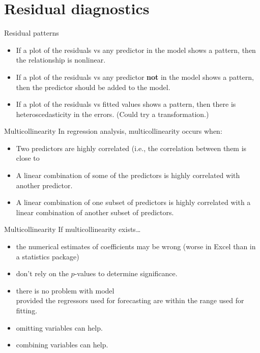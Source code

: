 \documentclass[14pt]{beamer}
\makeatletter
\def\biz{\begin{itemize}[<+-| alert@+>]}
\def\eiz{\end{itemize}}
\makeatother
\begin{document}
\section{Residual diagnostics}



\begin{frame}{Residual patterns}

\biz
\item If a plot of the residuals vs any predictor in the model shows a pattern, then the relationship is nonlinear.

\item If a plot of the residuals vs any predictor \textbf{not} in the model shows a pattern, then the predictor should be added to the model.

\item If a plot of the residuals vs fitted values shows a pattern, then there is heteroscedasticity in the errors. (Could try a transformation.)

\eiz
\end{frame}






\begin{frame}{Multicollinearity}
In regression analysis, multicollinearity occurs when:
\biz
\item  Two  predictors are highly  correlated (i.e., the correlation between them is close to 
\item A linear combination of some of the predictors is highly correlated  with another predictor.
\item  A linear combination of one subset of predictors is highly correlated with a linear combination of another
  subset of predictors. 
\eiz
\end{frame}

\begin{frame}{Multicollinearity}
If multicollinearity exists\dots
\biz%
\item the numerical estimates of coefficients may be wrong (worse in Excel than in a statistics package)
\item don't rely on the $p$-values to determine significance.
\item there is no problem with model \\ 
      provided the regressors used for forecasting are within the range used for fitting.
\item omitting variables can help.
\item combining variables can help.
\eiz


\end{frame}
\end{document}
